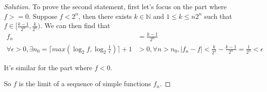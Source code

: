 \documentclass[a4paper, linespread=1.5]{article}
\begin{document}
\begin{proof}[Solution]
    	To prove the second statement, first let's focus on the part where $f>=0$.
    	Suppose $f<2^n$, then there exists $k\in\mathbb{N}$ and $1\le k \le n2^n$ such that $f \in[\frac{k-1}{2^n},\frac{k}{2^n}) $. We can then find that
    	\begin{align*}
    		f_n&=\frac{k-1}{2^n}\\
    		\forall \epsilon>0,\exists n_0=\lceil max(\log_{2}f,\log_{2}\frac{1}{\epsilon})\rceil+1&>0,\forall n>n_0,|f_n-f|<\frac{k}{2^k}-\frac{k-1}{2^n}=\frac{1}{2^n}<\epsilon
    	\end{align*}
    	
    	It's similar for the part where $f<0$.
    	
    	So $f$ is the limit of a sequence of simple functions $f_n$.
    	
    	
    \end{proof}
    
\end{document}
